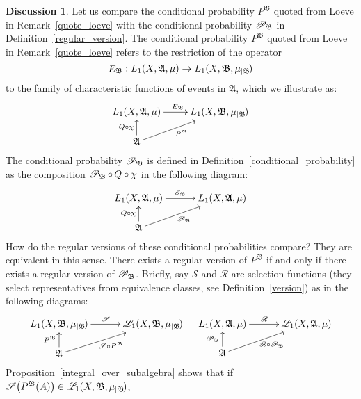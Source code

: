 \documentclass[
twoside=true,
paper=letter,
fontsize=9pt,
pagesize=auto,
leqno,
openany,
headsepline,
overfullrule,
]{scrbook}
\theoremstyle{plain}
\theoremstyle{plain}
\theoremstyle{definition}
\newtheorem{discussion}[thm]{Discussion}
\theoremstyle{bfnoteitalic}
\theoremstyle{bfnoteroman}
\newcommand{\sigalg}[1]{\mathfrak{#1}}
\newcommand{\cali}[1]{\mathscr{#1}}
\newcommand{\kondexpop}{\mathop{E}}
\newcommand{\condexpop}[1]{\mathop{\cali{E}\hspace{-1pt}}\nolimits_{#1}}
\newcommand{\condprobop}[1]{\mathop{\cali{P}\hspace{-1pt}}\nolimits_{#1}}
\newcommand{\restrictedto}[1]{_{\lvert#1}\kern-1.5pt}
\newcommand{\sigmaalgebra}{\sigalg{A}}
\newcommand{\sigmaalgebraii}{\sigalg{B}}
\newcommand{\Lone}{L_1(\measurespace, \sigmaalgebra, \measure)}
\newcommand{\caliLone}{\cali{L}_1(\measurespace, \sigmaalgebra, \measure)}
\newcommand{\measurespace}{X}
\newcommand{\measure}{\mu}
\newcommand{\seti}{A}
\newcommand{\regular}{\cali{R}}
\begin{document}
\begin{discussion}\label{regular_version_equivalence}
Let us compare the conditional probability $P^{\sigalg{B}}$ quoted from Loeve in Remark~\ref{quote_loeve} with the conditional probability $\condprobop{\sigmaalgebraii}$ in Definition~\ref{regular_version}.  The conditional probability
$P^{\sigalg{B}}$ quoted from Loeve in Remark~\ref{quote_loeve} refers to the restriction of the operator
\[
\kondexpop\nolimits_{\sigmaalgebraii}
:
L_1(\measurespace, \sigmaalgebra,\measure) \to
L_1(\measurespace, \sigmaalgebraii,\measure\restrictedto{\sigmaalgebraii})
\]
to the family of characteristic functions of events in $\sigmaalgebra$, which we illustrate as:
\[
\xymatrix@R=16pt{
L_1(\measurespace, \sigmaalgebra,\measure )
\ar[r]^{\kondexpop\nolimits_{\sigmaalgebraii}}
&
L_1(\measurespace, \sigmaalgebraii,\measure\restrictedto{\sigmaalgebraii})
\\
\sigmaalgebra
\ar[u]^{Q\circ\chi}
\ar[ur]_{P^{\sigalg{B}}}
}
\]
The conditional probability $\condprobop{\sigmaalgebraii}$ is defined in Definition~\ref{conditional_probability} as the composition
$\condprobop{\sigmaalgebraii} \circ\, Q \circ\chi$
in the following diagram:
\[
\xymatrix@R=16pt@C=30pt{
\Lone \ar[r]^{\condexpop{\sigmaalgebraii}} & \Lone\\
\sigmaalgebra \ar[u]^{Q\circ\chi} \ar[ur]_{\condprobop{\sigmaalgebraii}} & \\
}
\]
How do the regular versions of these  conditional probabilities compare? They are equivalent in this sense.
There exists a regular version of
$P^{\sigalg{B}}$ if and only if there exists a regular version of
$\condprobop{\sigmaalgebraii}$.
Briefly, say $\cali{S}$ and $\cali{R}$ are selection functions (they select representatives from equivalence classes, see Definition~\ref{version}) as in the following diagrams:
\[
\xymatrix@R=16pt@C=30pt{
L_1(\measurespace, \sigmaalgebraii,\measure\restrictedto{\sigmaalgebraii})
\ar[r]^{\cali{S}}
& \cali{L}_1(\measurespace, \sigmaalgebraii,\measure\restrictedto{\sigmaalgebraii})
\\
\sigmaalgebra
\ar[u]^{P^{\sigmaalgebraii}}
\ar[ur]_{\cali{S}\circ P^{\sigmaalgebraii}}
&
}
\quad
\xymatrix@R=16pt@C=30pt{
\Lone \ar[r]^{\regular}
& \caliLone
\\
\sigmaalgebra
\ar[u]^{\condprobop{\sigmaalgebraii}}
\ar[ur]_{\ \regular\circ\condprobop{\sigmaalgebraii}}
&
}
\]
Proposition~\ref{integral_over_subalgebra} shows that if
$\cali{S} \bigl( P^\sigmaalgebraii (\seti) \bigr)
\in
\cali{L}_1(\measurespace, \sigmaalgebraii,\measure\restrictedto{\sigmaalgebraii})$,

\end{discussion}
\end{document}
